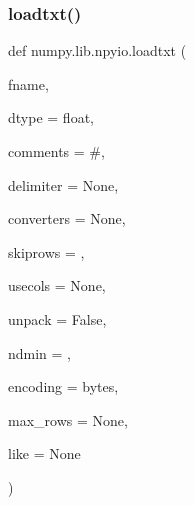 \mbox{\label{namespacenumpy_1_1lib_1_1npyio_abf1b7ed5e18ba358b89b7a2470105034}} 
\subsubsection{\texorpdfstring{loadtxt()}{loadtxt()}}
{\footnotesize\ttfamily def numpy.\+lib.\+npyio.\+loadtxt (\begin{DoxyParamCaption}\item[{}]{fname,  }\item[{}]{dtype = {\ttfamily float},  }\item[{}]{comments = {\ttfamily \textquotesingle{}\#\textquotesingle{}},  }\item[{}]{delimiter = {\ttfamily None},  }\item[{}]{converters = {\ttfamily None},  }\item[{}]{skiprows = {},  }\item[{}]{usecols = {\ttfamily None},  }\item[{}]{unpack = {\ttfamily False},  }\item[{}]{ndmin = {},  }\item[{}]{encoding = {\ttfamily \textquotesingle{}bytes\textquotesingle{}},  }\item[{}]{max\+\_\+rows = {\ttfamily None},  }\item[{}]{like = {\ttfamily None} }\end{DoxyParamCaption})}

